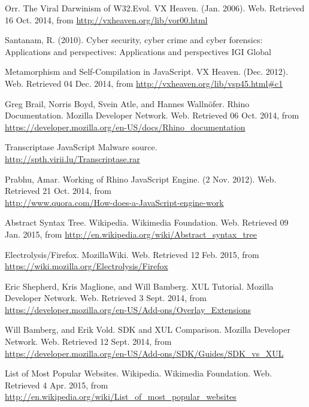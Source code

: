 \begin{thebibliography}{10}
 Orr. The Viral Darwinism of W32.Evol. VX Heaven. (Jan. 2006). Web. Retrieved 16 Oct. 2014, from \url{http://vxheaven.org/lib/vor00.html}

 Santanam, R. (2010). Cyber security, cyber crime and cyber forensics: Applications and perspectives: Applications and perspectives IGI Global

 Metamorphism and Self-Compilation in JavaScript. VX Heaven. (Dec. 2012). Web. Retrieved 04 Dec. 2014, from \url{http://vxheaven.org/lib/vsp45.html#c1}

 Greg Brail, Norris Boyd, Svein Atle, and Hannes Wallnöfer. Rhino Documentation. Mozilla Developer Network. Web. Retrieved 06 Oct. 2014, from \\
\url{https://developer.mozilla.org/en-US/docs/Rhino_documentation}

 Transcriptase JavaScript Malware source. \\
\url{http://spth.virii.lu/Transcriptase.rar}

 Prabhu, Amar. Working of Rhino JavaScript Engine. (2 Nov. 2012). Web. Retrieved 21 Oct. 2014, from \\ 
\url{http://www.quora.com/How-does-a-JavaScript-engine-work}

 Abstract Syntax Tree. Wikipedia. Wikimedia Foundation. Web. Retrieved 09 Jan. 2015, from \url{http://en.wikipedia.org/wiki/Abstract_syntax_tree}

 Electrolysis/Firefox. MozillaWiki. Web. Retrieved 12 Feb. 2015, from \\
\url{https://wiki.mozilla.org/Electrolysis/Firefox}

 Eric Shepherd, Kris Maglione, and Will Bamberg. XUL Tutorial. Mozilla Developer Network. Web. Retrieved 3 Sept. 2014, from \\
\url{https://developer.mozilla.org/en-US/Add-ons/Overlay_Extensions}

 Will Bamberg, and Erik Vold. SDK and XUL Comparison. Mozilla Developer Network. Web. Retrieved 12 Sept. 2014, from \\
\url{https://developer.mozilla.org/en-US/Add-ons/SDK/Guides/SDK_vs_XUL}

 List of Most Popular Websites. Wikipedia. Wikimedia Foundation. Web. Retrieved 4 Apr. 2015, from \\
\url{http://en.wikipedia.org/wiki/List_of_most_popular_websites}

\end{thebibliography}
